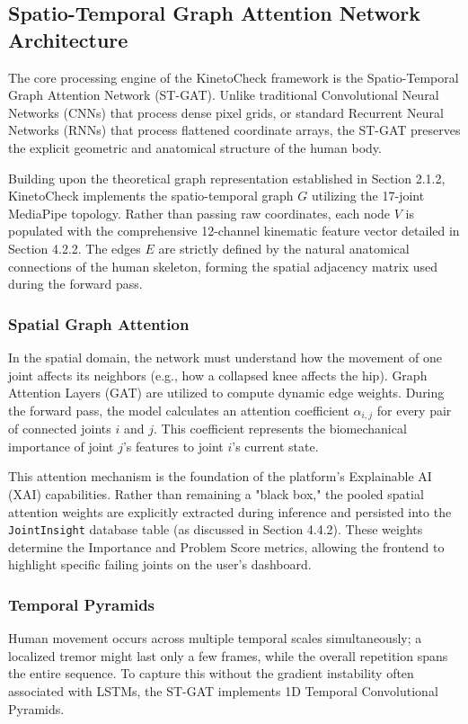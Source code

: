 \subsection{Spatio-Temporal Graph Attention Network Architecture}
The core processing engine of the KinetoCheck framework is the Spatio-Temporal Graph Attention Network (ST-GAT). Unlike traditional Convolutional Neural Networks (CNNs) that process dense pixel grids, or standard Recurrent Neural Networks (RNNs) that process flattened coordinate arrays, the ST-GAT preserves the explicit geometric and anatomical structure of the human body.

Building upon the theoretical graph representation established in Section 2.1.2, KinetoCheck implements the spatio-temporal graph $G$ utilizing the 17-joint MediaPipe topology. Rather than passing raw coordinates, each node $V$ is populated with the comprehensive 12-channel kinematic feature vector detailed in Section 4.2.2. The edges $E$ are strictly defined by the natural anatomical connections of the human skeleton, forming the spatial adjacency matrix used during the forward pass.

\subsubsection*{Spatial Graph Attention}
In the spatial domain, the network must understand how the movement of one joint affects its neighbors (e.g., how a collapsed knee affects the hip). Graph Attention Layers (GAT) are utilized to compute dynamic edge weights. During the forward pass, the model calculates an attention coefficient $\alpha_{i,j}$ for every pair of connected joints $i$ and $j$. This coefficient represents the biomechanical importance of joint $j$'s features to joint $i$'s current state.

This attention mechanism is the foundation of the platform’s Explainable AI (XAI) capabilities. Rather than remaining a "black box," the pooled spatial attention weights are explicitly extracted during inference and persisted into the \texttt{JointInsight} database table (as discussed in Section 4.4.2). These weights determine the Importance and Problem Score metrics, allowing the frontend to highlight specific failing joints on the user’s dashboard.

\subsubsection*{Temporal Pyramids}
Human movement occurs across multiple temporal scales simultaneously; a localized tremor might last only a few frames, while the overall repetition spans the entire sequence. To capture this without the gradient instability often associated with LSTMs, the ST-GAT implements 1D Temporal Convolutional Pyramids.

